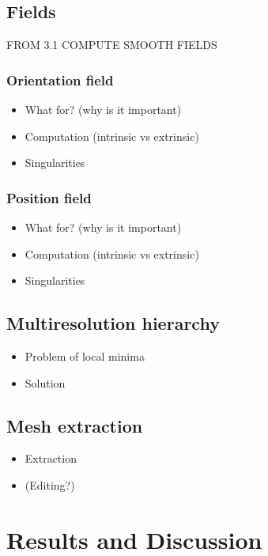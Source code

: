 \documentclass{ACGSeminar}
\begin{document}
\subsection{Fields}
FROM 3.1 COMPUTE SMOOTH FIELDS

\subsubsection{Orientation field}
\begin{itemize}
	\item	What for? (why is it important)
	\item	Computation (intrinsic vs extrinsic)
	\item	Singularities
\end{itemize}

\subsubsection{Position field}
\begin{itemize}
	\item	What for? (why is it important)
	\item	Computation (intrinsic vs extrinsic)
	\item	Singularities
\end{itemize}

\subsection{Multiresolution hierarchy}
\begin{itemize}
	\item	Problem of local minima
	\item	Solution
\end{itemize}

\subsection{Mesh extraction}
\cite{jakob2015instant}
\begin{itemize}
	\item	Extraction
	\item	(Editing?)
\end{itemize}

\section{Results and Discussion}
\end{document}
